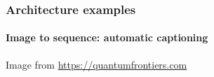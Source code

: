 \documentclass[9pt]{beamer}
\begin{document}






\begin{frame}
  \frametitle{Architecture examples}

  \framesubtitle{Image to sequence: automatic captioning}

  \begin{center}
  \end{center}
  {\small Image from \url{https://quantumfrontiers.com}}
\end{frame}
\end{document}

